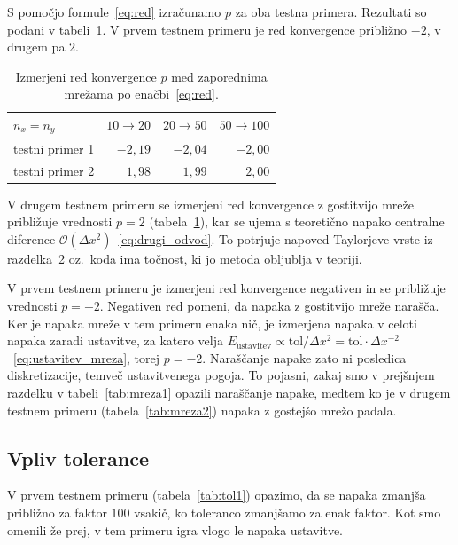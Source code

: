 \documentclass[a4paper,11pt]{article}
\begin{document}
	S pomočjo formule~\eqref{eq:red} izračunamo $p$ za oba testna primera. Rezultati so podani v tabeli~\ref{tab:red}. V prvem testnem primeru je red konvergence približno $-2$, v drugem pa $2$.
	
	\begin{table}[htbp]
		\centering
		\begin{tabular}{lrrr}
			\toprule
			$n_x = n_y$     & $10 \to 20$ & $20 \to 50$ & $50 \to 100$ \\
			\midrule
			testni primer 1 & $-2{,}19$   & $-2{,}04$   & $-2{,}00$    \\
			testni primer 2 & $1{,}98$    & $1{,}99$    & $2{,}00$     \\
			\bottomrule
		\end{tabular}
		\caption{Izmerjeni red konvergence $p$ med zaporednima mrežama po enačbi~\eqref{eq:red}.}
		\label{tab:red}
	\end{table}
	
	V drugem testnem primeru se izmerjeni red konvergence z gostitvijo mreže približuje vrednosti $p = 2$ (tabela~\ref{tab:red}), kar se ujema s teoretično napako centralne diference $\mathcal{O}(\Delta x^2)$~\eqref{eq:drugi_odvod}. To potrjuje napoved Taylorjeve vrste iz razdelka~2 oz.\ koda ima točnost, ki jo metoda obljublja v teoriji.
	
	V prvem testnem primeru je izmerjeni red konvergence negativen in se približuje vrednosti $p = -2$. Negativen red pomeni, da napaka z gostitvijo mreže narašča. Ker je napaka mreže v tem primeru enaka nič, je izmerjena napaka v celoti napaka zaradi ustavitve, za katero velja $E_{\text{ustavitev}} \propto \text{tol}/\Delta x^2 = \text{tol}\cdot\Delta x^{-2}$~\eqref{eq:ustavitev_mreza}, torej $p = -2$. Naraščanje napake zato ni posledica diskretizacije, temveč ustavitvenega pogoja. To pojasni, zakaj smo v prejšnjem razdelku v tabeli~\ref{tab:mreza1} opazili naraščanje napake, medtem ko je v drugem testnem primeru (tabela~\ref{tab:mreza2}) napaka z gostejšo mrežo padala.
	
	\subsection{Vpliv tolerance}
	
	V prvem testnem primeru (tabela~\ref{tab:tol1}) opazimo, da se napaka zmanjša približno za faktor $100$ vsakič, ko toleranco zmanjšamo za enak faktor. Kot smo omenili že prej, v tem primeru igra vlogo le napaka ustavitve.
	
\end{document}
